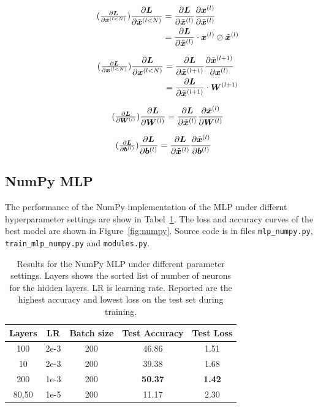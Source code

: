 \documentclass{article}
\newcommand\·{\ensuremath{\cdot}}
\newcommand\…{\ensuremath{\ldots}}
\newcommand\pf[2]{\ensuremath{\frac{\partial {#1}}{\partial {#2}}}}
\newcommand*{\B}[1]{\ifmmode\bm{#1}\else\textbf{#1}\fi}
\newcommand\1{\ensuremath{\mathds{1}}}
\begin{document}
\begin{align*}
  \tag{$\pf{\B{L}}{\tilde{\B{x}}^{(l<N)}}$}
  \pf{\B{L}}{\tilde{\B{x}}^{(l<N)}}
  &= \pf{\B{L}}{\tilde{\B{x}}^{(l)}}\pf{\B{x}^{(l)}}{\tilde{\B{x}}^{(l)}}\\
  &= \pf{\B{L}}{\tilde{\B{x}}^{(l)}}\·\B{x}^{(l)}\oslash\tilde{\B{x}}^{(l)}
\end{align*}

\begin{align*}
  \tag{$\pf{\B{L}}{\B{x}^{(l<N)}}$}
  \pf{\B{L}}{\B{x}^{(l<N)}}
  &= \pf{\B{L}}{\tilde{\B{x}}^{(l+1)}}\pf{\tilde{\B{x}}^{(l+1)}}{\B{x}^{(l)}}\\
  &= \pf{\B{L}}{\tilde{\B{x}}^{(l+1)}}\·\B{W}^{(l+1)}\\
\end{align*}

\begin{align*}
  \tag{$\pf{\B{L}}{\B{W}^{(l)}}$}
  \pf{\B{L}}{\B{W}^{(l)}}
  &= \pf{\B{L}}{\tilde{\B{x}}^{(l)}}\pf{\tilde{\B{x}}^{(l)}}{\B{W}^{(l)}}\\
\end{align*}

\begin{align*}
  \tag{$\pf{\B{L}}{\B{b}^{(l)}}$}
  \pf{\B{L}}{\B{b}^{(l)}}
  &= \pf{\B{L}}{\tilde{\B{x}}^{(l)}}\pf{\tilde{\B{x}}^{(l)}}{\B{b}^{(l)}}
\end{align*}

\subsection{NumPy MLP}
The performance of the NumPy implementation of the MLP under differnt hyperparameter settings are show in Tabel~\ref{tab:numpy}.
The loss and accuracy curves of the best model are shown in Figure~\ref{fig:numpy}.
Source code is in files \texttt{mlp\_numpy.py}, \texttt{train\_mlp\_numpy.py} and \texttt{modules.py}.

\begin{table}
  \centering
  \begin{tabular}{ccccc}
    Layers & LR & Batch size & Test Accuracy & Test Loss\\\toprule
    100 & 2e-3 & 200 & 46.86 & 1.51\\
    10 & 2e-3 & 200 & 39.38 & 1.68\\
    200 & 1e-3 & 200 & \textbf{50.37} & \textbf{1.42}\\
    80,50 & 1e-5 & 200 & 11.17 & 2.30\\
  \end{tabular}
  \caption{Results for the NumPy MLP under different parameter settings. Layers shows the sorted list of number of neurons for the hidden layers. LR is learning rate. Reported are the highest accuracy and lowest loss on the test set during training.}
  \label{tab:numpy}
\end{table}
\end{document}
